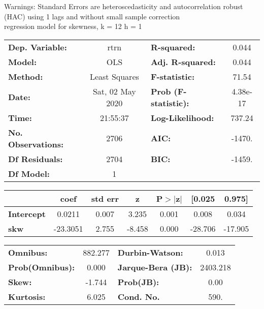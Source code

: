 Warnings: \newline
 [1] Standard Errors are heteroscedasticity and autocorrelation robust (HAC) using 1 lags and without small sample correction\\ 

regression model for skewness, k = 12 h = 1\begin{center}
\begin{tabular}{lclc}
\toprule
\textbf{Dep. Variable:}    &       rtrn       & \textbf{  R-squared:         } &     0.044   \\
\textbf{Model:}            &       OLS        & \textbf{  Adj. R-squared:    } &     0.044   \\
\textbf{Method:}           &  Least Squares   & \textbf{  F-statistic:       } &     71.54   \\
\textbf{Date:}             & Sat, 02 May 2020 & \textbf{  Prob (F-statistic):} &  4.38e-17   \\
\textbf{Time:}             &     21:55:37     & \textbf{  Log-Likelihood:    } &    737.24   \\
\textbf{No. Observations:} &        2706      & \textbf{  AIC:               } &    -1470.   \\
\textbf{Df Residuals:}     &        2704      & \textbf{  BIC:               } &    -1459.   \\
\textbf{Df Model:}         &           1      & \textbf{                     } &             \\
\bottomrule
\end{tabular}
\begin{tabular}{lcccccc}
                   & \textbf{coef} & \textbf{std err} & \textbf{z} & \textbf{P$> |$z$|$} & \textbf{[0.025} & \textbf{0.975]}  \\
\midrule
\textbf{Intercept} &       0.0211  &        0.007     &     3.235  &         0.001        &        0.008    &        0.034     \\
\textbf{skw}       &     -23.3051  &        2.755     &    -8.458  &         0.000        &      -28.706    &      -17.905     \\
\bottomrule
\end{tabular}
\begin{tabular}{lclc}
\textbf{Omnibus:}       & 882.277 & \textbf{  Durbin-Watson:     } &    0.013  \\
\textbf{Prob(Omnibus):} &   0.000 & \textbf{  Jarque-Bera (JB):  } & 2403.218  \\
\textbf{Skew:}          &  -1.744 & \textbf{  Prob(JB):          } &     0.00  \\
\textbf{Kurtosis:}      &   6.025 & \textbf{  Cond. No.          } &     590.  \\
\bottomrule
\end{tabular}
\end{center}

